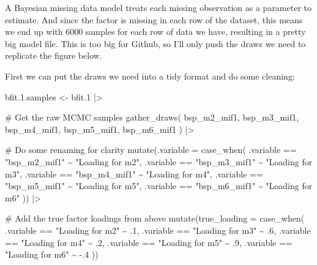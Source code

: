 \documentclass[
  letterpaper,
  DIV=11,
  numbers=noendperiod]{scrreprt}
\newenvironment{Shaded}{\begin{snugshade}}{\end{snugshade}}
\newcommand{\AttributeTok}[1]{\textcolor[rgb]{0.40,0.45,0.13}{#1}}
\newcommand{\CommentTok}[1]{\textcolor[rgb]{0.37,0.37,0.37}{#1}}
\newcommand{\DecValTok}[1]{\textcolor[rgb]{0.68,0.00,0.00}{#1}}
\newcommand{\FloatTok}[1]{\textcolor[rgb]{0.68,0.00,0.00}{#1}}
\newcommand{\FunctionTok}[1]{\textcolor[rgb]{0.28,0.35,0.67}{#1}}
\newcommand{\NormalTok}[1]{\textcolor[rgb]{0.00,0.23,0.31}{#1}}
\newcommand{\OtherTok}[1]{\textcolor[rgb]{0.00,0.23,0.31}{#1}}
\newcommand{\SpecialCharTok}[1]{\textcolor[rgb]{0.37,0.37,0.37}{#1}}
\newcommand{\StringTok}[1]{\textcolor[rgb]{0.13,0.47,0.30}{#1}}
\begin{document}
A Bayesian missing data model treats each missing observation as a
parameter to estimate. And since the factor is missing in each row of
the dataset, this means we end up with 6000 samples for each row of data
we have, resulting in a pretty big model file. This is too big for
Github, so I'll only push the draws we need to replicate the figure
below.

First we can put the draws we need into a tidy format and do some
cleaning:

\begin{Shaded}
\begin{Highlighting}[]
\NormalTok{bfit.}\FloatTok{1.}\NormalTok{samples }\OtherTok{\textless{}{-}}\NormalTok{ bfit}\FloatTok{.1} \SpecialCharTok{|\textgreater{}}

  \CommentTok{\# Get the raw MCMC samples}
  \FunctionTok{gather\_draws}\NormalTok{(}
\NormalTok{    bsp\_m2\_mif1,}
\NormalTok{    bsp\_m3\_mif1,}
\NormalTok{    bsp\_m4\_mif1,}
\NormalTok{    bsp\_m5\_mif1,}
\NormalTok{    bsp\_m6\_mif1}
\NormalTok{  ) }\SpecialCharTok{|\textgreater{}}

  \CommentTok{\# Do some renaming for clarity}
  \FunctionTok{mutate}\NormalTok{(}\AttributeTok{.variable =} \FunctionTok{case\_when}\NormalTok{(}
\NormalTok{    .variable }\SpecialCharTok{==} \StringTok{"bsp\_m2\_mif1"} \SpecialCharTok{\textasciitilde{}} \StringTok{"Loading for m2"}\NormalTok{,}
\NormalTok{    .variable }\SpecialCharTok{==} \StringTok{"bsp\_m3\_mif1"} \SpecialCharTok{\textasciitilde{}} \StringTok{"Loading for m3"}\NormalTok{,}
\NormalTok{    .variable }\SpecialCharTok{==} \StringTok{"bsp\_m4\_mif1"} \SpecialCharTok{\textasciitilde{}} \StringTok{"Loading for m4"}\NormalTok{,}
\NormalTok{    .variable }\SpecialCharTok{==} \StringTok{"bsp\_m5\_mif1"} \SpecialCharTok{\textasciitilde{}} \StringTok{"Loading for m5"}\NormalTok{,}
\NormalTok{    .variable }\SpecialCharTok{==} \StringTok{"bsp\_m6\_mif1"} \SpecialCharTok{\textasciitilde{}} \StringTok{"Loading for m6"}
\NormalTok{  )) }\SpecialCharTok{|\textgreater{}} 

  \CommentTok{\# Add the true factor loadings from above}
  \FunctionTok{mutate}\NormalTok{(}\AttributeTok{true\_loading =} \FunctionTok{case\_when}\NormalTok{(}
\NormalTok{    .variable }\SpecialCharTok{==} \StringTok{"Loading for m2"} \SpecialCharTok{\textasciitilde{}}\NormalTok{ .}\DecValTok{1}\NormalTok{,}
\NormalTok{    .variable }\SpecialCharTok{==} \StringTok{"Loading for m3"} \SpecialCharTok{\textasciitilde{}}\NormalTok{ .}\DecValTok{6}\NormalTok{,}
\NormalTok{    .variable }\SpecialCharTok{==} \StringTok{"Loading for m4"} \SpecialCharTok{\textasciitilde{}}\NormalTok{ .}\DecValTok{2}\NormalTok{,}
\NormalTok{    .variable }\SpecialCharTok{==} \StringTok{"Loading for m5"} \SpecialCharTok{\textasciitilde{}}\NormalTok{ .}\DecValTok{9}\NormalTok{,}
\NormalTok{    .variable }\SpecialCharTok{==} \StringTok{"Loading for m6"} \SpecialCharTok{\textasciitilde{}} \SpecialCharTok{{-}}\NormalTok{.}\DecValTok{4}
\NormalTok{  )) }


\end{Highlighting}
\end{Shaded}
\end{document}
